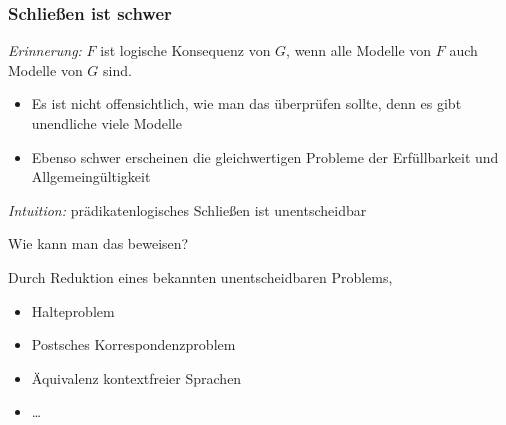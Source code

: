 \documentclass[aspectratio=1610,onlymath]{beamer}
\begin{document}
\maketitle

\begin{frame}\frametitle{Schließen ist schwer}

\emph{Erinnerung:} $F$ ist logische Konsequenz von $G$, wenn alle Modelle von $F$ auch Modelle von $G$ sind.
\begin{itemize}
\item Es ist nicht offensichtlich, wie man das überprüfen sollte, denn es gibt unendliche viele Modelle
\item Ebenso schwer erscheinen die gleichwertigen Probleme der Erfüllbarkeit und Allgemeingültigkeit
\end{itemize}\pause
\emph{Intuition:} prädikatenlogisches Schließen ist unentscheidbar
\bigskip

\alert{Wie kann man das beweisen?}\pause\bigskip

Durch Reduktion eines bekannten unentscheidbaren Problems, 
\begin{itemize}
\item Halteproblem
\item Postsches Korrespondenzproblem
\item Äquivalenz kontextfreier Sprachen
\item \ldots
\end{itemize}

\end{frame}
\end{document}
